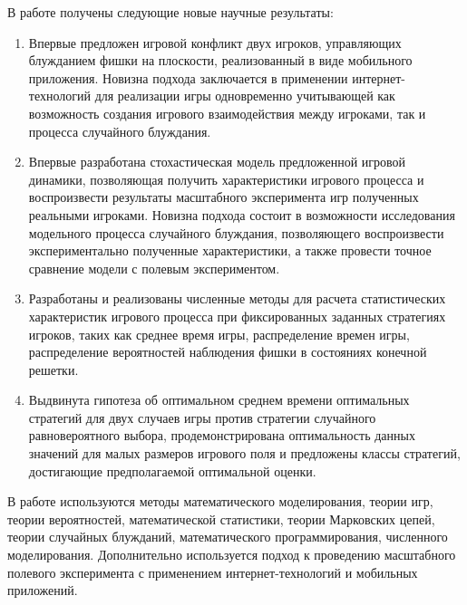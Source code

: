 {\novelty}
В работе получены следующие новые научные результаты:
\begin{enumerate}[beginpenalty=10000] %
  \item Впервые предложен игровой конфликт двух игроков, управляющих блужданием фишки на плоскости, реализованный в виде мобильного приложения.
        Новизна подхода заключается в применении интернет-технологий для реализации игры одновременно учитывающей как 
        возможность создания игрового взаимодействия между игроками, так и процесса случайного блуждания.
  \item Впервые разработана стохастическая модель предложенной игровой динамики, позволяющая получить характеристики игрового процесса 
        и воспроизвести результаты масштабного эксперимента игр полученных реальными игроками. Новизна подхода состоит в возможности 
        исследования модельного процесса случайного блуждания, позволяющего воспроизвести экспериментально полученные характеристики,
        а также провести точное сравнение модели с полевым экспериментом.
  \item Разработаны и реализованы численные методы для расчета статистических характеристик игрового процесса при фиксированных заданных стратегиях игроков,
        таких как среднее время игры, распределение времен игры, распределение вероятностей наблюдения фишки в состояниях конечной решетки. 
  \item Выдвинута гипотеза об оптимальном среднем времени оптимальных стратегий для двух случаев игры против стратегии случайного равновероятного выбора, продемонстрирована
        оптимальность данных значений для малых размеров игрового поля и предложены классы стратегий, достигающие предполагаемой оптимальной оценки.
\end{enumerate}


{\methods} 
В работе используются методы математического моделирования, теории игр, теории вероятностей, математической статистики, 
теории Марковских цепей, теории случайных блужданий, математического программирования, численного моделирования. 
Дополнительно используется подход к проведению масштабного полевого эксперимента с применением интернет-технологий и мобильных приложений.


